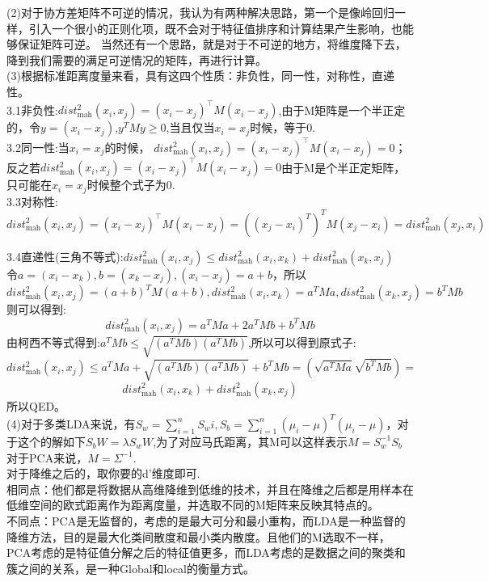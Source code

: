 \documentclass[answers]{exam}  %
\begin{document}
\begin{questions}
\begin{solution}
\begin{parts}
    (2)对于协方差矩阵不可逆的情况，我认为有两种解决思路，第一个是像岭回归一样，引入一个很小的正则化项，既不会对于特征值排序和计算结果产生影响，也能够保证矩阵可逆。
    当然还有一个思路，就是对于不可逆的地方，将维度降下去，降到我们需要的满足可逆情况的矩阵，再进行计算。\\
    
    (3)根据标准距离度量来看，具有这四个性质：非负性，同一性，对称性，直递性。\\
    3.1非负性:$dist_{\text{mah}}^2(x_i, x_j) = (x_i - x_j)^\top M (x_i - x_j)$,由于M矩阵是一个半正定的，令$y = (x_i - x_j)$,$y^T M y \geq 0$,当且仅当$x_i = x_j$时候，等于0.\\
    
    3.2同一性:当$x_i = x_j$的时候， $dist_{\text{mah}}^2(x_i, x_j) = (x_i - x_j)^\top M (x_i - x_j) = 0$；反之若$dist_{\text{mah}}^2(x_i, x_j) = (x_i - x_j)^\top M (x_i - x_j) = 0$由于M是个半正定矩阵，只可能在$x_i = x_j$时候整个式子为0.\\
    
    3.3对称性:
    \[
        dist_{\text{mah}}^2(x_i, x_j) = (x_i - x_j)^\top M (x_i - x_j) = ((x_j - x_i)^T)^T M (x_j - x_i) = dist_{\text{mah}}^2(x_j, x_i)
    \]
    
    3.4直递性(三角不等式):$dist_{\text{mah}}^2(x_i, x_j) \leq dist_{\text{mah}}^2(x_i, x_k) + dist_{\text{mah}}^2(x_k, x_j)$\\
    令$a = (x_i - x_k), b = (x_k - x_j), (x_i -x_j) = a+b$，所以
    \[
        dist_{\text{mah}}^2(x_i, x_j) = (a+b)^T M (a+b),dist_{\text{mah}}^2(x_i, x_k) = a^T M a,dist_{\text{mah}}^2(x_k, x_j) = b^T M b
    \]
    则可以得到:
    \[
        dist_{\text{mah}}^2(x_i, x_j) =a^T M a + 2a^T M b + b^T M b 
    \]
    由柯西不等式得到:$a^T M b \leq \sqrt{(a^T M b)(a^T M b)}$,所以可以得到原式子:
    \[
        dist_{\text{mah}}^2(x_i, x_j) \leq a^T M a +  \sqrt{(a^T M b)(a^T M b)} + b^T M b = (\sqrt{a^T Ma}\sqrt{b^T Mb}) = 
    \]    
    \[
        dist_{\text{mah}}^2(x_i, x_k) + dist_{\text{mah}}^2(x_k, x_j)
    \]
    所以QED。\\
    (4)对于多类LDA来说，有$S_w = \sum_{i=1}^{n}S_wi, S_b = \sum_{i=1}^{n} (\mu_i - \mu)^T (\mu_i - \mu)$，对于这个的解如下$S_b W = \lambda S_w W$,为了对应马氏距离，其M可以这样表示$M = S_w^{-1}S_b$\\
    对于PCA来说，$M = \Sigma^{-1}$.\\
    对于降维之后的，取你要的d'维度即可.\\
    相同点：他们都是将数据从高维降维到低维的技术，并且在降维之后都是用样本在低维空间的欧式距离作为距离度量，并选取不同的M矩阵来反映其特点的。\\
    不同点：PCA是无监督的，考虑的是最大可分和最小重构，而LDA是一种监督的降维方法，目的是最大化类间散度和最小类内散度。且他们的M选取不一样，PCA考虑的是特征值分解之后的特征值更多，而LDA考虑的是数据之间的聚类和簇之间的关系，是一种Global和local的衡量方式。\\

\end{parts}
\end{solution}
\end{questions}
\end{document}
